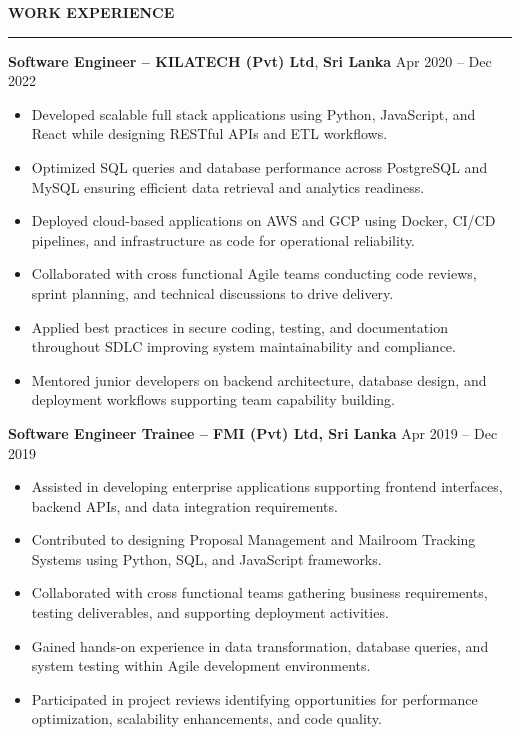 \documentclass[10pt,letterpaper]{article}
\begin{document}
\vspace{8pt}

\textbf{WORK EXPERIENCE}\\[-8pt]
\noindent\rule{\textwidth}{1pt}

\vspace{-2pt}

\textbf{Software Engineer -- KILATECH (Pvt) Ltd}, \textbf{Sri Lanka} \hfill Apr 2020 -- Dec 2022

\vspace{-1pt}

\begin{itemize}
\item Developed scalable full stack applications using Python, JavaScript, and React while designing RESTful APIs and ETL workflows.
\item Optimized SQL queries and database performance across PostgreSQL and MySQL ensuring efficient data retrieval and analytics readiness.
\item Deployed cloud-based applications on AWS and GCP using Docker, CI/CD pipelines, and infrastructure as code for operational reliability.
\item Collaborated with cross functional Agile teams conducting code reviews, sprint planning, and technical discussions to drive delivery.
\item Applied best practices in secure coding, testing, and documentation throughout SDLC improving system maintainability and compliance.
\item Mentored junior developers on backend architecture, database design, and deployment workflows supporting team capability building.
\end{itemize}

\textbf{Software Engineer Trainee -- FMI (Pvt) Ltd, Sri Lanka} \hfill Apr 2019 -- Dec 2019

\vspace{-1pt}

\begin{itemize}
\item Assisted in developing enterprise applications supporting frontend interfaces, backend APIs, and data integration requirements.
\item Contributed to designing Proposal Management and Mailroom Tracking Systems using Python, SQL, and JavaScript frameworks.
\item Collaborated with cross functional teams gathering business requirements, testing deliverables, and supporting deployment activities.
\item Gained hands-on experience in data transformation, database queries, and system testing within Agile development environments.
\item Participated in project reviews identifying opportunities for performance optimization, scalability enhancements, and code quality.
\end{itemize}
\end{document}
